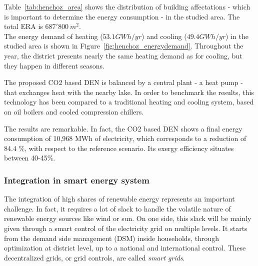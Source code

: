 \documentclass{article}
\begin{document}

Table~\ref{tab:henchoz_area} shows the distribution of building affectations - which is important to determine the energy consumption - in the studied area. The total ERA is $687'800 \ m^{2}$.\\



The energy demand of heating ($53.1 GWh/yr$) and cooling ($49.4 GWh/yr$) in the studied area is shown in Figure~\ref{fig:henchoz_energydemand}. Throughout the year, the district presents nearly the same heating demand as for cooling, but they happen in different seasons. 


The proposed CO2 based DEN is balanced by a central plant - a heat pump - that exchanges heat with the nearby lake. In order to benchmark the results, this technology has been compared to a traditional heating and cooling system, based on oil boilers and cooled compression chillers.

The results are remarkable. In fact, the CO2 based DEN shows a final energy consumption of 10,968 MWh of electricity, which corresponds to a reduction of 84.4 \%, with respect to the reference scenario. Its exergy efficiency situates between 40-45\%.
%
%


\subsubsection{Integration in smart energy system}
The integration of high shares of renewable energy represents an important challenge. In fact, it requires a lot of slack to handle the volatile nature of renewable energy sources like wind or sun. On one side, this slack will be mainly given through a smart control of the electricity grid on multiple levels. It starts from the demand side management (DSM) inside households, through optimization at district level, up to a national and international control. These decentralized grids, or grid controls, are called \textit{smart grids}. \\
\end{document}
